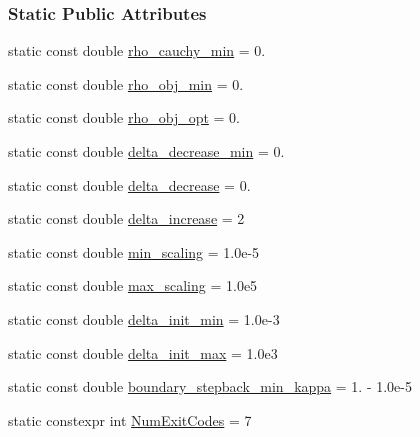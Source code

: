 \subsubsection*{Static Public Attributes}
\begin{DoxyCompactItemize}
\item 
static const double \hyperlink{classmappel_1_1TrustRegionMaximizer_aff3b0746e84ccdcbeadeb92bf36fe63d}{rho\+\_\+cauchy\+\_\+min} = 0.
\item 
static const double \hyperlink{classmappel_1_1TrustRegionMaximizer_a2b483473663b4fd9f6c75dfbc19c4c3e}{rho\+\_\+obj\+\_\+min} = 0.
\item 
static const double \hyperlink{classmappel_1_1TrustRegionMaximizer_a493c379e980a954cd62e9bc12a614473}{rho\+\_\+obj\+\_\+opt} = 0.
\item 
static const double \hyperlink{classmappel_1_1TrustRegionMaximizer_ab1d057688e8dbc766571e768df4b4171}{delta\+\_\+decrease\+\_\+min} = 0.
\item 
static const double \hyperlink{classmappel_1_1TrustRegionMaximizer_a0b268fcfb5cdda85ee8b572a88be2751}{delta\+\_\+decrease} = 0.
\item 
static const double \hyperlink{classmappel_1_1TrustRegionMaximizer_a381f19cef538aee3fbaca20d0378c941}{delta\+\_\+increase} = 2
\item 
static const double \hyperlink{classmappel_1_1TrustRegionMaximizer_abf5fc9992128173691438a92772236b5}{min\+\_\+scaling} = 1.\+0e-\/5
\item 
static const double \hyperlink{classmappel_1_1TrustRegionMaximizer_a37a277685002f747b8abef5ce374eb29}{max\+\_\+scaling} = 1.\+0e5
\item 
static const double \hyperlink{classmappel_1_1TrustRegionMaximizer_aa3a14bfa1f848f3dbe2472bc82623e05}{delta\+\_\+init\+\_\+min} = 1.\+0e-\/3
\item 
static const double \hyperlink{classmappel_1_1TrustRegionMaximizer_aeb2067e81b002a0fb1e99ce32794f394}{delta\+\_\+init\+\_\+max} = 1.\+0e3
\item 
static const double \hyperlink{classmappel_1_1TrustRegionMaximizer_aa5b3ab917d1e7c661bfaad6b4e36c414}{boundary\+\_\+stepback\+\_\+min\+\_\+kappa} = 1. -\/ 1.\+0e-\/5
\item 
static constexpr int \hyperlink{classmappel_1_1IterativeMaximizer_a04888d87aa205d54e7cae5a97d1c1e75}{Num\+Exit\+Codes} = 7
\end{DoxyCompactItemize}
